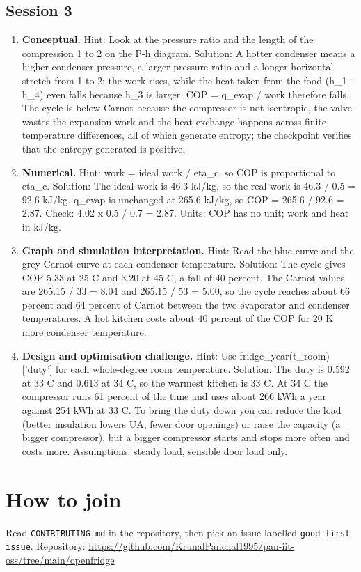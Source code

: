 \documentclass[11pt,a4paper]{article}
\begin{document}
\subsection*{Session 3}
\begin{enumerate}[nosep]
\item \textbf{Conceptual.} Hint: Look at the pressure ratio and the length of the compression 1 to 2 on the P-h diagram. Solution: A hotter condenser means a higher condenser pressure, a larger pressure ratio and a longer horizontal stretch from 1 to 2: the work rises, while the heat taken from the food (h\_1 - h\_4) even falls because h\_3 is larger. COP = q\_evap / work therefore falls. The cycle is below Carnot because the compressor is not isentropic, the valve wastes the expansion work and the heat exchange happens across finite temperature differences, all of which generate entropy; the checkpoint verifies that the entropy generated is positive.
\item \textbf{Numerical.} Hint: work = ideal work / eta\_c, so COP is proportional to eta\_c. Solution: The ideal work is 46.3 kJ/kg, so the real work is 46.3 / 0.5 = 92.6 kJ/kg. q\_evap is unchanged at 265.6 kJ/kg, so COP = 265.6 / 92.6 = 2.87. Check: 4.02 x 0.5 / 0.7 = 2.87. Units: COP has no unit; work and heat in kJ/kg.
\item \textbf{Graph and simulation interpretation.} Hint: Read the blue curve and the grey Carnot curve at each condenser temperature. Solution: The cycle gives COP 5.33 at 25 C and 3.20 at 45 C, a fall of 40 percent. The Carnot values are 265.15 / 33 = 8.04 and 265.15 / 53 = 5.00, so the cycle reaches about 66 percent and 64 percent of Carnot between the two evaporator and condenser temperatures. A hot kitchen costs about 40 percent of the COP for 20 K more condenser temperature.
\item \textbf{Design and optimisation challenge.} Hint: Use fridge\_year(t\_room)['duty'] for each whole-degree room temperature. Solution: The duty is 0.592 at 33 C and 0.613 at 34 C, so the warmest kitchen is 33 C. At 34 C the compressor runs 61 percent of the time and uses about 266 kWh a year against 254 kWh at 33 C. To bring the duty down you can reduce the load (better insulation lowers UA, fewer door openings) or raise the capacity (a bigger compressor), but a bigger compressor starts and stops more often and costs more. Assumptions: steady load, sensible door load only.
\end{enumerate}

\section{How to join}
Read \texttt{CONTRIBUTING.md} in the repository, then pick an issue labelled \texttt{good first issue}. Repository: \url{https://github.com/KrunalPanchal1995/pan-iit-oss/tree/main/openfridge}
\end{document}
